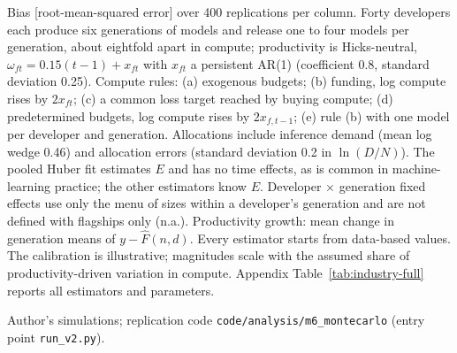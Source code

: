 \begin{table}[tp]
\begin{tabular}{@{}l ccccc@{}}
\bottomrule
\end{tabular}
\par\smallskip
\begin{tablenotes}Bias [root-mean-squared error] over 400 replications per column. Forty developers each produce six generations of models and release one to four models per generation, about eightfold apart in compute; productivity is Hicks-neutral, $\omega_{ft}=0.15(t-1)+x_{ft}$ with $x_{ft}$ a persistent AR(1) (coefficient 0.8, standard deviation 0.25). Compute rules: (a) exogenous budgets; (b) funding, log compute rises by $2x_{ft}$; (c) a common loss target reached by buying compute; (d) predetermined budgets, log compute rises by $2x_{f,t-1}$; (e) rule (b) with one model per developer and generation. Allocations include inference demand (mean log wedge 0.46) and allocation errors (standard deviation 0.2 in $\ln(D/N)$). The pooled Huber fit estimates $E$ and has no time effects, as is common in machine-learning practice; the other estimators know $E$. Developer $\times$ generation fixed effects use only the menu of sizes within a developer's generation and are not defined with flagships only (n.a.). Productivity growth: mean change in generation means of $y-\hat F(n,d)$. Every estimator starts from data-based values. The calibration is illustrative; magnitudes scale with the assumed share of productivity-driven variation in compute. Appendix Table~\ref{tab:industry-full} reports all estimators and parameters.\end{tablenotes}
\begin{tablenotes}[Source]Author's simulations; replication code \texttt{code/analysis/m6\_montecarlo} (entry point \texttt{run\_v2.py}).\end{tablenotes}
\end{table}
